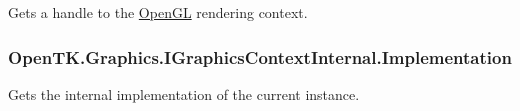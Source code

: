 Gets a handle to the \hyperlink{namespace_open_t_k_1_1_graphics_1_1_open_g_l}{Open\-G\-L} rendering context. 

\hypertarget{interface_open_t_k_1_1_graphics_1_1_i_graphics_context_internal_a1827254204928b0db6085d229eefbca5}{
\subsubsection[{Implementation}]{ Open\-T\-K.\-Graphics.\-I\-Graphics\-Context\-Internal.\-Implementation\hspace{0.3cm}{\ttfamily [get]}}}\label{interface_open_t_k_1_1_graphics_1_1_i_graphics_context_internal_a1827254204928b0db6085d229eefbca5}


Gets the internal implementation of the current instance. 

